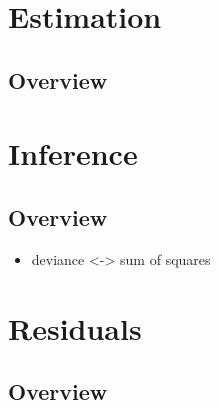 \documentclass[11pt,fleqn]{book} %
\begin{document}

\chapter{Estimation}

\section{Overview}



\chapter{Inference}

\section{Overview}

\begin{itemize}
	\item deviance <-> sum of squares
\end{itemize}



\chapter{Residuals}

\section{Overview}


\end{document}
